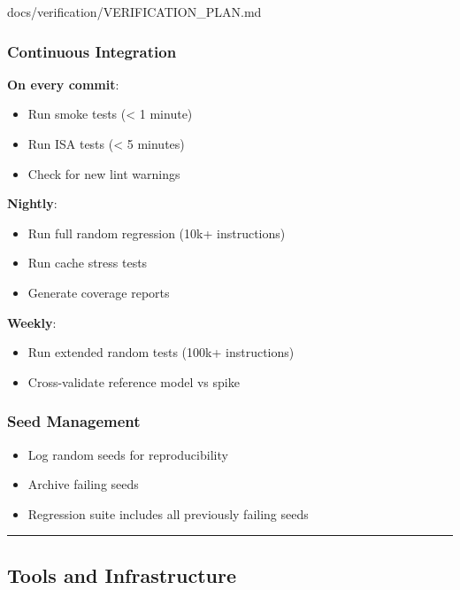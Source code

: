 \begin{relocated}{docs/verification/VERIFICATION_PLAN.md}
\subsubsection{Continuous Integration}\label{ds:ch:verification-plan:continuous-integration}

\textbf{On every commit}:

\begin{itemize}
\tightlist
\item
  Run smoke tests (\textless{} 1 minute)
\item
  Run ISA tests (\textless{} 5 minutes)
\item
  Check for new lint warnings
\end{itemize}

\textbf{Nightly}:

\begin{itemize}
\tightlist
\item
  Run full random regression (10k+ instructions)
\item
  Run cache stress tests
\item
  Generate coverage reports
\end{itemize}

\textbf{Weekly}:

\begin{itemize}
\tightlist
\item
  Run extended random tests (100k+ instructions)
\item
  Cross-validate reference model vs spike
\end{itemize}

\subsubsection{Seed Management}\label{ds:ch:verification-plan:seed-management}

\begin{itemize}
\tightlist
\item
  Log random seeds for reproducibility
\item
  Archive failing seeds
\item
  Regression suite includes all previously failing seeds
\end{itemize}

\begin{center}\rule{0.5\linewidth}{0.5pt}\end{center}

\subsection{Tools and Infrastructure}\label{ds:ch:verification-plan:tools-and-infrastructure}


\end{relocated}
